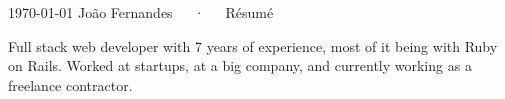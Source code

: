 \documentclass[11pt, a4paper]{awesome-cv}
\begin{document}
\makecvheader[C]

\makecvfooter
  {\today}
  {João Fernandes~~~·~~~Résumé}
  {\thepage}




\begin{cvparagraph}

Full stack web developer with 7 years of experience, most of it being with Ruby on Rails.
Worked at startups, at a big company, and currently working as a freelance contractor.
\end{cvparagraph}


\end{document}
